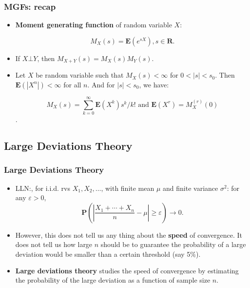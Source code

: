 \documentclass[handout]{beamer}
\newcommand{\BP}{\mathbf{P}}
\newcommand{\BE}{\mathbf{E}}
\begin{document}
\frame
{
  \frametitle{MGFs: recap} 

   \begin{itemize}
   
                \item<1->\textbf{Moment generating function} of random variable $X$:
                
                $$M_{X}(s)=\BE(e^{sX}), s\in \mathbf{R}.$$

                
                \item<2-> If $X\bot Y$, then $M_{X+Y} (s)=M_X(s) M_Y(s)$. 
                
                \item<3->  Let $X$ be random variable such that $M_X(s)<\infty$ for $0 < |s| < s_0$. Then $\BE(|X^n|)<\infty$ for all $n$. And for $|s|<s_0$, we have:
                
                $$M_X(s)=\sum_{k=0}^{\infty} \BE(X^k)s^k/k! \text{  and  } \BE(X^r)=M_X^{(r)} (0)$$. 

\end{itemize}
}



\subsection{Large Deviations Theory}

\frame
{
  \frametitle{Large Deviations Theory} 

   \begin{itemize}

                 \item<1-> LLN:, for i.i.d. rvs $X_1, X_2,\ldots$, with finite mean $\mu$ and finite variance $\sigma^2$: for any $\varepsilon > 0$, 
                 $$\BP \left( \left|\frac{X_1+\cdots+X_n}{n}-\mu \right|\geq \varepsilon \right) \rightarrow 0.$$
  
                   \item<2-> However, this does not tell us any thing about the \textbf{speed} of convergence. It does not tell us how large $n$ should be to guarantee the probability of a large deviation would be smaller than a certain threshold (say 5\%).                   
                   
                    \item<3-> \textbf{Large deviations theory} studies the speed of convergence by estimating the probability of the large deviation as a function of sample size $n$. 
                    
                  \end{itemize}
}
\end{document}
